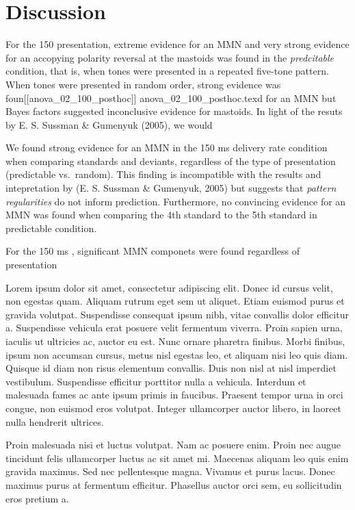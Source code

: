 \documentclass[twoside, man, a4paper,12pt, nofontenc]{apa7}
\begin{document}
\hypertarget{discussion}{%
\section{Discussion}\label{discussion}}

For the 150 presentation, extreme evidence for an MMN and very strong
evidence for an accopying polarity reversal at the mastoids was found in
the \emph{predcitable} condition, that is, when tones were presented in
a repeated five-tone pattern. When tones were presented in random order,
strong evidence was foun{[}{[}anova\_02\_100\_posthoc{]}{]}
anova\_02\_100\_posthoc.texd for an MMN but Bayes factors suggested
inconclusive evidence for mastoids. In light of the resuts by E. S.
Sussman \& Gumenyuk (2005), we would



We found strong evidence for an MMN in the 150 ms delivery rate
condition when comparing standards and deviants, regardless of the type
of presentation (predictable vs.~random). This finding is incompatible
with the results and intepretation by (E. S. Sussman \& Gumenyuk, 2005)
but suggests that \emph{pattern regularities} do not inform prediction.
Furthermore, no convincing evidence for an MMN was found when comparing
the 4th standard to the 5th standard in predictable condition.

For the 150 ms , significant MMN componets were found regardless of
presentation

Lorem ipsum dolor sit amet, consectetur adipiscing elit. Donec id cursus
velit, non egestas quam. Aliquam rutrum eget sem ut aliquet. Etiam
euismod purus et gravida volutpat. Suspendisse consequat ipsum nibh,
vitae convallis dolor efficitur a. Suspendisse vehicula erat posuere
velit fermentum viverra. Proin sapien urna, iaculis ut ultricies ac,
auctor eu est. Nunc ornare pharetra finibus. Morbi finibus, ipsum non
accumsan cursus, metus nisl egestas leo, et aliquam nisi leo quis diam.
Quisque id diam non risus elementum convallis. Duis non nisl at nisl
imperdiet vestibulum. Suspendisse efficitur porttitor nulla a vehicula.
Interdum et malesuada fames ac ante ipsum primis in faucibus. Praesent
tempor urna in orci congue, non euismod eros volutpat. Integer
ullamcorper auctor libero, in laoreet nulla hendrerit ultrices.

Proin malesuada nisi et luctus volutpat. Nam ac posuere enim. Proin nec
augue tincidunt felis ullamcorper luctus ac sit amet mi. Maecenas
aliquam leo quis enim gravida maximus. Sed nec pellentesque magna.
Vivamus et purus lacus. Donec maximus purus at fermentum efficitur.
Phasellus auctor orci sem, eu sollicitudin eros pretium a.
\end{document}
